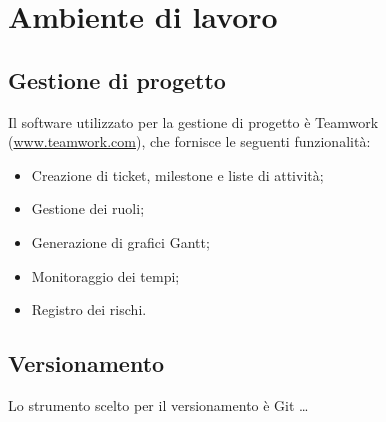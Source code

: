 \section{Ambiente di lavoro}

\subsection{Gestione di progetto}
Il software utilizzato per la gestione di progetto è Teamwork (\href{http://www.teamwork.com}{www.teamwork.com}), che fornisce le seguenti funzionalità:

\begin{itemize}
\item Creazione di ticket, milestone e liste di attività;
\item Gestione dei ruoli;
\item Generazione di grafici Gantt;
\item Monitoraggio dei tempi;
\item Registro dei rischi.
\end{itemize}

\subsection{Versionamento}
Lo strumento scelto per il versionamento è Git \dots